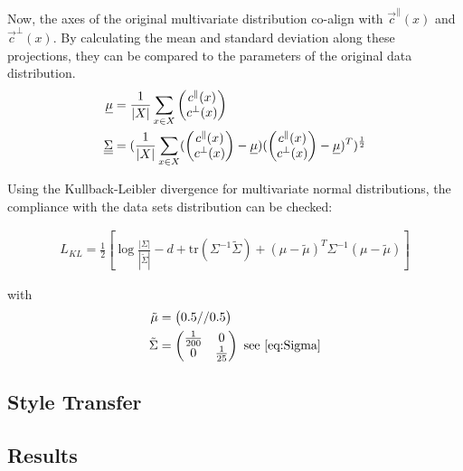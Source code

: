 Now, the axes of the original multivariate distribution co-align with $\vec{c}^\parallel(x)$
and $\vec{c}^\bot(x)$.
By calculating the mean and standard deviation along these projections, they can
be compared to the parameters of the original data distribution.
\begin{align}
    \underline\mu & = \frac{1}{\vert X \vert}\sum_{x \in X} \begin{pmatrix} c^\parallel(x) \\ c^\bot(x) \end{pmatrix} \\
    \underline{\underline{\Sigma}} & = (\frac{1}{\vert X \vert} \sum_{x \in X}
        (\begin{pmatrix} c^\parallel(x) \\ c^\bot(x) \end{pmatrix} - \underline\mu)
        (\begin{pmatrix} c^\parallel(x) \\ c^\bot(x) \end{pmatrix} - \underline\mu)^T
        )^{\frac{1}{2}} \\
\end{align}

Using the Kullback-Leibler divergence for multivariate normal distributions,
the compliance with the data sets distribution can be checked:

\begin{align}
    L_{KL} = \frac{1}{2}\left[\log\frac{|\Sigma|}{|\tilde{\Sigma}|} - d + \text{tr} ( \Sigma^{-1}\tilde{\Sigma} ) + (\mu - \tilde{\mu})^T \Sigma^{-1}(\mu - \tilde{\mu})\right]
\end{align}

with 
\begin{align}
    \tilde{\mu} & = \begin{pmatrix} 0.5 // 0.5 \end{pmatrix} \\
    \tilde{\Sigma} & = \begin{pmatrix} \frac{1}{200} & 0 \\ 0 & \frac{1}{25} \end{pmatrix} \text{ see \eqref{eq:Sigma}}
\end{align}


\subsection{Style Transfer}


\subsection{Results}


